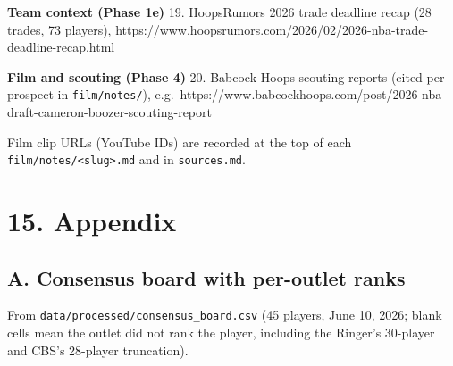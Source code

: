\documentclass[
  10pt,
]{article}
\begin{document}
\textbf{Team context (Phase 1e)} 19. HoopsRumors 2026 trade deadline recap (28
trades, 73 players),
https://www.hoopsrumors.com/2026/02/2026-nba-trade-deadline-recap.html

\textbf{Film and scouting (Phase 4)} 20. Babcock Hoops scouting reports (cited
per prospect in \texttt{film/notes/}),
e.g.~https://www.babcockhoops.com/post/2026-nba-draft-cameron-boozer-scouting-report

Film clip URLs (YouTube IDs) are recorded at the top of each
\texttt{film/notes/\textless{}slug\textgreater{}.md} and in \texttt{sources.md}.

\section{15. Appendix}\label{appendix}

\subsection{A. Consensus board with per-outlet
ranks}\label{a.-consensus-board-with-per-outlet-ranks}

From \texttt{data/processed/consensus\_board.csv} (45 players, June 10, 2026;
blank cells mean the outlet did not rank the player, including the Ringer's
30-player and CBS's 28-player truncation).
\end{document}
